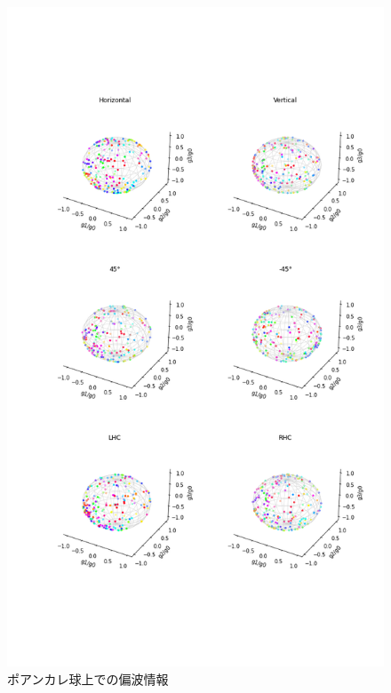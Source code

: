 \documentclass[uplatex,a4paper,12pt]{jsarticle}
\begin{document}
\begin{figure}[t]
	\centering
	\includegraphics[scale=0.5]{../img/20230203_standing_4_PS_x.png}
    \caption{ポアンカレ球上での偏波情報}
	\label{fig:ps}
\end{figure}
\end{document}
